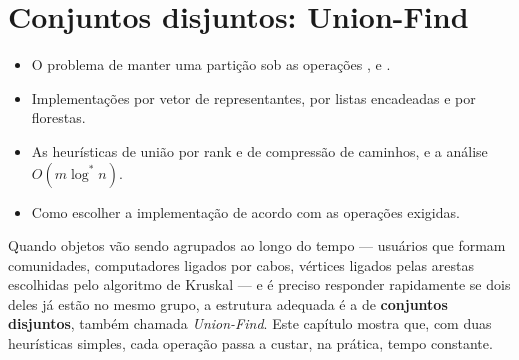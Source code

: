 \chapter{Conjuntos disjuntos: Union-Find}\label{cap:uf}\label{sec:uf}
\begin{objetivos}
\begin{itemize}
  \item O problema de manter uma partição sob as operações \MakeSet, \Find{} e \Union.
  \item Implementações por vetor de representantes, por listas encadeadas e por florestas.
  \item As heurísticas de união por rank e de compressão de caminhos, e a análise $O(m\log^*n)$.
  \item Como escolher a implementação de acordo com as operações exigidas.
\end{itemize}
\end{objetivos}

Quando objetos vão sendo agrupados ao longo do tempo --- usuários que formam comunidades, computadores ligados por cabos, vértices ligados pelas arestas escolhidas pelo algoritmo de Kruskal --- e é preciso responder rapidamente se dois deles já estão no mesmo grupo, a estrutura adequada é a de \textbf{conjuntos disjuntos}, também chamada \emph{Union-Find}. Este capítulo mostra que, com duas heurísticas simples, cada operação passa a custar, na prática, tempo constante.

\begin{figura}
\end{figura}

